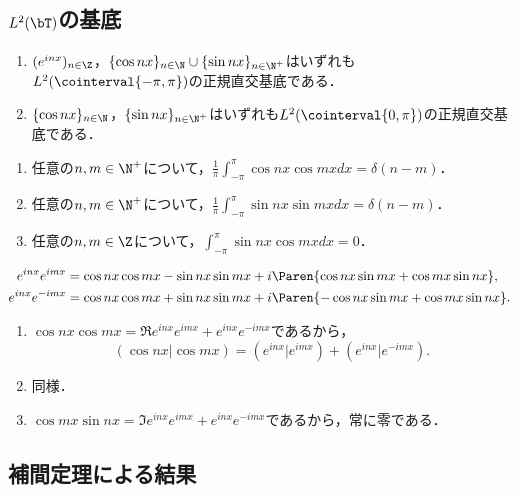 \documentclass[uplatex,dvipdfmx]{jsreport}
\begin{document}
\subsection{$L^2(\bT)$の基底}

\begin{proposition}[三角多項式]\mbox{}
    \begin{enumerate}
        \item $(e^{inx})_{n\in\Z}$，$\{\cos nx\}_{n\in\N}\cup\{\sin nx\}_{n\in\N^+}$はいずれも$L^2(\cointerval{-\pi,\pi})$の正規直交基底である．
        \item $\{\cos nx\}_{n\in\N}$，$\{\sin nx\}_{n\in\N^+}$はいずれも$L^2(\cointerval{0,\pi})$の正規直交基底である．
    \end{enumerate}
\end{proposition}

\begin{lemma}\mbox{}
    \begin{enumerate}
        \item 任意の$n,m\in\N^+$について，$\frac{1}{\pi}\int^\pi_{-\pi}\cos nx\cos mxdx=\delta(n-m)$．
        \item 任意の$n,m\in\N^+$について，$\frac{1}{\pi}\int^\pi_{-\pi}\sin nx\sin mxdx=\delta(n-m)$．
        \item 任意の$n,m\in\Z$について，$\int^\pi_{-\pi}\sin nx\cos mxdx=0$．
    \end{enumerate}
\end{lemma}
\begin{Proof}
    \begin{align*}
        e^{inx}e^{imx}&=\cos nx\cos mx-\sin nx\sin mx+i\Paren{\cos nx\sin mx+\cos mx\sin nx},\\
        e^{inx}e^{-imx}&=\cos nx\cos mx+\sin nx\sin mx+i\Paren{-\cos nx\sin mx+\cos mx\sin nx}.
    \end{align*}
    \begin{enumerate}
        \item $\cos nx\cos mx=\Re e^{inx}e^{imx}+e^{inx}e^{-imx}$であるから，
        \[(\cos nx|\cos mx)=(e^{inx}|e^{imx})+(e^{inx}|e^{-imx}).\]
        \item 同様．
        \item $\cos mx\sin nx=\Im e^{inx}e^{imx}+e^{inx}e^{-imx}$であるから，常に零である．
    \end{enumerate}
\end{Proof}

\subsection{補間定理による結果}
\end{document}

